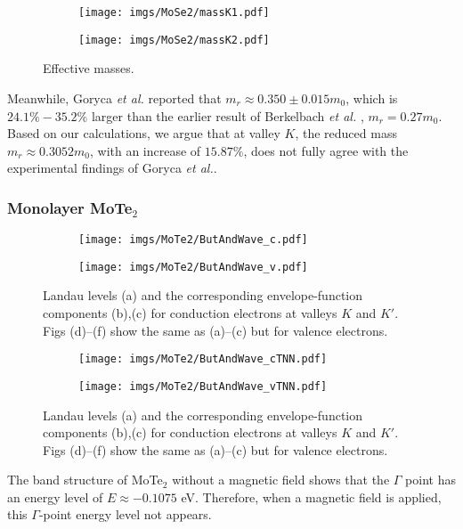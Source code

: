 \documentclass{article}
\begin{document}
\begin{figure}[htb]
	\begin{subfigure}{0.495\textwidth}
		\centering
		\texttt{[image: imgs/MoSe2/massK1.pdf]}
	\end{subfigure}
	\begin{subfigure}{0.495\textwidth}
		\centering
		\texttt{[image: imgs/MoSe2/massK2.pdf]}
	\end{subfigure}
	\caption{Effective masses.}
\end{figure}

Meanwhile, Goryca \textit{et al.} \cite{goryca2019} reported that $m_{r} \approx 0.350 \pm 0.015 m_{0}$, which is $24.1\%-35.2\%$ larger than the earlier result of Berkelbach \textit{et al.} \cite{berkelbach2013}, $m_{r} = 0.27 m_{0}$.
Based on our calculations, we argue that at valley $K$, the reduced mass $m_{r} \approx 0.3052 m_{0}$, with an increase of $15.87\%$, does not fully agree with the experimental findings of Goryca \textit{et al.}.






\newpage
\subsubsection*{Monolayer MoTe$_{2}$}
\begin{figure}[htb]
	\begin{subfigure}{0.495\textwidth}
		\centering
		\texttt{[image: imgs/MoTe2/ButAndWave\_c.pdf]}
	\end{subfigure}
	\begin{subfigure}{0.495\textwidth}
		\centering
		\texttt{[image: imgs/MoTe2/ButAndWave\_v.pdf]}
	\end{subfigure}
	\caption{Landau levels (a) and the corresponding envelope-function components (b),(c) for conduction electrons at valleys $K$ and $K'$. Figs (d)–(f) show the same as (a)–(c) but for valence electrons.}
\end{figure}
\begin{figure}[!h]
	\begin{subfigure}{0.495\textwidth}
		\centering
		\texttt{[image: imgs/MoTe2/ButAndWave\_cTNN.pdf]}
	\end{subfigure}
	\begin{subfigure}{0.495\textwidth}
		\centering
		\texttt{[image: imgs/MoTe2/ButAndWave\_vTNN.pdf]}
	\end{subfigure}
	\caption{Landau levels (a) and the corresponding envelope-function components (b),(c) for conduction electrons at valleys $K$ and $K'$. Figs (d)–(f) show the same as (a)–(c) but for valence electrons.}
\end{figure}
The band structure of MoTe$_{2}$ without a magnetic field shows that the $\Gamma$ point has an energy level of $E \approx -0.1075$ eV. Therefore, when a magnetic field is applied, this $\Gamma$-point energy level not appears.
\end{document}
